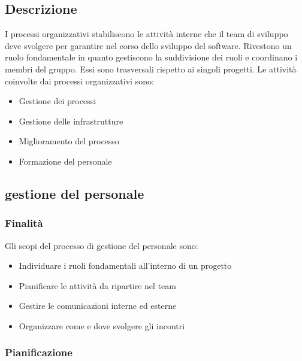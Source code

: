 \documentclass[../norme-di-progetto.tex]{subfiles}
\begin{document}
\subsection{Descrizione}
\label{sub:Descrizione}
I processi organizzativi stabiliscono le attività interne che il team di sviluppo deve svolgere per garantire  nel corso dello sviluppo del software. Rivestono un ruolo fondamentale in quanto gestiscono la suddivisione dei ruoli e coordinano i membri del gruppo. Essi sono trasversali rispetto ai singoli progetti.
Le attività coinvolte dai processi organizzativi sono:
\begin{itemize}
	\item Gestione dei processi
	\item Gestione delle infrastrutture
	\item Miglioramento del processo
	\item Formazione del personale
\end{itemize}
\subsection{gestione del personale}
\label{sub:gestione del personale}
\subsubsection{Finalità}
\label{subs:finalità}
Gli scopi del processo di gestione del personale sono:
\begin{itemize}
	\item Individuare i ruoli fondamentali all'interno di un progetto
	\item Pianificare le attività da ripartire nel team
	\item Gestire le comunicazioni interne ed esterne
	\item Organizzare come e dove svolgere gli incontri
\end{itemize}
\subsubsection{Pianificazione}
\end{document}
